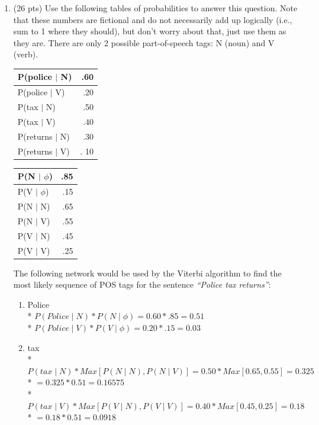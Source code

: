 \documentclass[11pt]{article}
\begin{document}
\begin{enumerate}
\newpage
\item (26 pts) Use the following tables of probabilities 
to answer this question. Note that these numbers are 
fictional and do not necessarily add up logically (i.e., sum to 1
where they should), but don't worry about that, just use them as they
are.  There are only 2 possible part-of-speech tags: N (noun) and V (verb). 

\begin{center}
\begin{tabular}{|lr|} \hline
P(police $\mid$ N) & .60 \\ \hline
P(police $\mid$ V) & .20 \\ \hline
P(tax $\mid$ N) & .50 \\ \hline
P(tax $\mid$ V) & .40 \\ \hline
P(returns $\mid$ N) & .30 \\ \hline
P(returns $\mid$ V) & . 10 \\ \hline
\end{tabular}
\hspace*{.5in}
\begin{tabular}{|lr|} \hline
P(N $\mid$ $\phi$) & .85 \\ \hline
P(V $\mid$ $\phi$) & .15 \\ \hline
P(N $\mid$ N) & .65 \\ \hline
P(N $\mid$ V) & .55 \\ \hline
P(V $\mid$ N) & .45 \\ \hline
P(V $\mid$ V) & .25 \\ \hline
\end{tabular}
\end{center}

The following network would be used by the Viterbi algorithm
to find the most likely sequence of POS tags for the sentence {\it
  ``Police tax returns''}: 

\begin{center}
\end{center}

\begin {enumerate}
  \color{red}
  \item[] Police 
  \\* \quad  $ P(Police\mid N)*P(N\mid\phi)=0.60 * .85= 0.51$
  \\* \quad  $ P(Police\mid V)*P(V\mid\phi)=0.20 * .15= 0.03$
  \item[] tax
  \\* \quad  $ P(tax\mid N)*Max[P(N \mid N),P(N \mid V)]=0.50 *Max[0.65,0.55]= 0.325$
  \\* \quad  $ =0.325*0.51= 0.16575$
  \\* \quad  $ P(tax\mid V)*Max[P(V \mid N),P(V \mid V)]=0.40 *Max[0.45,0.25]= 0.18$
  \\* \quad  $ =0.18*0.51 =0.0918$


\end{enumerate}
\end{enumerate}
\end{document}
